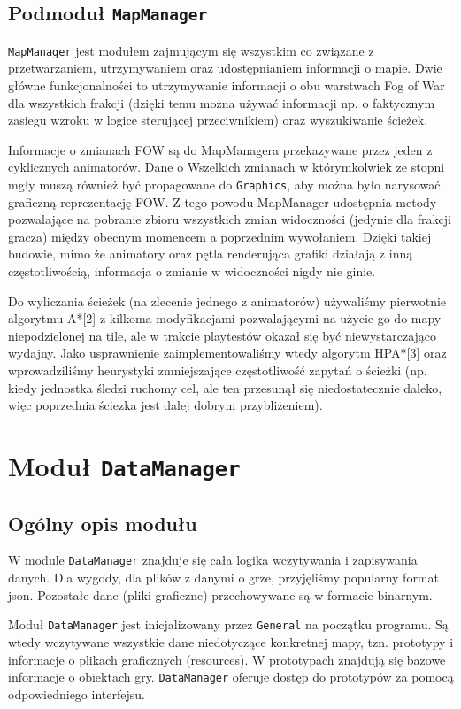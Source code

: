 \documentclass[licencjacka]{pracamgr}
\begin{document}
    \subsection{Podmoduł \texttt{MapManager}}
    \texttt{MapManager} jest modułem zajmującym się wszystkim co związane z przetwarzaniem, utrzymywaniem oraz udostępnianiem
    informacji o mapie. Dwie główne funkcjonalności to utrzymywanie informacji o obu warstwach Fog of War dla wszystkich
    frakcji (dzięki temu można używać informacji np. o faktycznym zasiegu wzroku w logice sterującej przeciwnikiem) oraz
    wyszukiwanie ścieżek.

    Informacje o zmianach FOW są do MapManagera przekazywane przez jeden z cyklicznych animatorów. Dane o Wszelkich
    zmianach w którymkolwiek ze stopni mgły muszą również być propagowane do \texttt{Graphics}, aby można było narysować
    graficzną reprezentację FOW. Z tego powodu MapManager udostępnia metody pozwalające na pobranie zbioru wszystkich
    zmian widoczności (jedynie dla frakcji gracza) między obecnym momencem a poprzednim wywołaniem. Dzięki takiej
    budowie, mimo że animatory oraz pętla renderująca grafiki działają z inną częstotliwością, informacja o zmianie w
    widoczności nigdy nie ginie.

    Do wyliczania ścieżek (na zlecenie jednego z animatorów) używaliśmy pierwotnie algorytmu A*[2] z kilkoma
    modyfikacjami pozwalającymi na użycie go do mapy niepodzielonej na tile, ale w trakcie playtestów okazał się być
    niewystarczająco wydajny. Jako usprawnienie zaimplementowaliśmy wtedy algorytm HPA*[3] oraz wprowadziliśmy
    heurystyki zmniejszające częstotliwość zapytań o ścieżki (np. kiedy jednostka śledzi ruchomy cel, ale ten przesunął
    się niedostatecznie daleko, więc poprzednia ściezka jest dalej dobrym przybliżeniem).

  \section{Moduł \texttt{DataManager}}
    \subsection{Ogólny opis modułu}
      W module \texttt{DataManager} znajduje się cała logika wczytywania i zapisywania danych. Dla wygody, dla plików z
      danymi o grze, przyjęliśmy popularny format json. Pozostałe dane (pliki graficzne) przechowywane są w formacie
      binarnym.

      Moduł \texttt{DataManager} jest inicjalizowany przez \texttt{General} na początku programu. Są wtedy wczytywane wszystkie dane
      niedotyczące konkretnej mapy, tzn. prototypy i informacje o plikach graficznych (resources). W prototypach
      znajdują się bazowe informacje o obiektach gry. \texttt{DataManager} oferuje dostęp do prototypów za pomocą
      odpowiedniego interfejsu.
\end{document}
